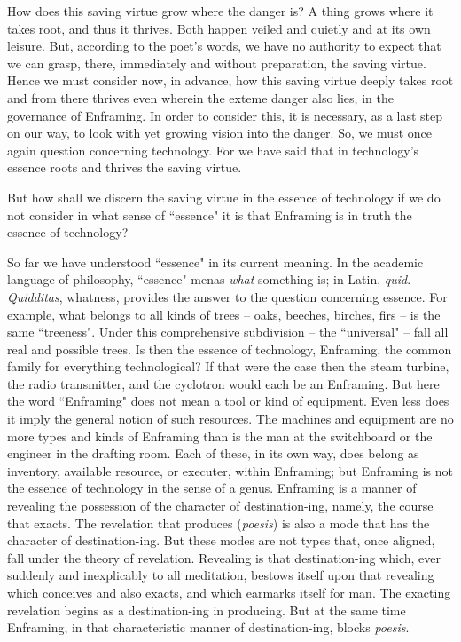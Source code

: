 \documentclass[12pt]{article}
\begin{document}
How does this saving virtue grow where the danger is?  A thing grows where it takes root, and thus it thrives. Both happen veiled and quietly and at its own leisure.  But, according to the poet's words, we have no authority to expect that we can grasp, there, immediately and without preparation, the saving virtue. Hence we must consider now, in advance, how this saving virtue deeply takes root and from there thrives even wherein the exteme danger also lies, in the governance of Enframing. In order to consider this, it is necessary, as a last step on our way, to look with yet growing vision into the danger. So, we must once again question concerning technology. For we have said that in technology's essence roots and thrives the saving virtue.

But how shall we discern the saving virtue in the essence of technology if we do not consider in what sense of ``essence" it is that Enframing is in truth the essence of technology?

So far we have understood ``essence" in its current meaning. In the academic language of philosophy, ``essence" menas \textit{what} something is; in Latin, \textit{quid}. \textit{Quidditas}, whatness, provides the answer to the question concerning essence. For example, what belongs to all kinds of trees -- oaks, beeches, birches, firs -- is the same ``treeness". Under this comprehensive subdivision -- the ``universal" -- fall all real and possible trees. Is then the essence of technology, Enframing, the common family for everything technological? If that were the case then the steam turbine, the radio transmitter, and the cyclotron would each be an Enframing. But here the word ``Enframing" does not mean a tool or kind of equipment. Even less does it imply the general notion of such resources. The machines and equipment are no more types and kinds of Enframing than is the man at the switchboard or the engineer in the drafting room. Each of these, in its own way, does belong as inventory, available resource, or executer, within Enframing; but Enframing is not the essence of technology in the sense of a genus. Enframing is a manner of revealing the possession of the character of destination-ing, namely, the course that exacts. The revelation that produces (\textit{p{\-o}esis}) is also a mode that has the character of destination-ing. But these modes are not types that, once aligned, fall under the theory of revelation. Revealing is that destination-ing which, ever suddenly and inexplicably to all meditation, bestows itself upon that revealing which conceives and also exacts, and which earmarks itself for man. The exacting revelation begins as a destination-ing in producing. But at the same time Enframing, in that characteristic manner of destination-ing, blocks \textit{p{\-o}esis}.
\end{document}

